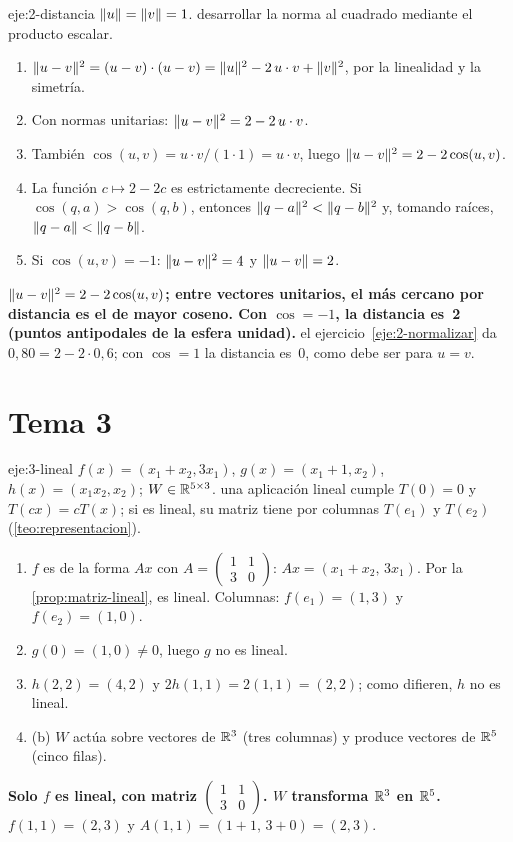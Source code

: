 \begin{solucion}{eje:2-distancia}
\datos $\lVert u\rVert=\lVert v\rVert=1$.
\planteamiento desarrollar la norma al cuadrado mediante el producto escalar.
\pasos
\begin{enumerate}[label=\arabic*.]
  \item $\lVert u-v\rVert^{2}=(u-v)\cdot(u-v)=\lVert u\rVert^{2}-2\,u\cdot v+\lVert v\rVert^{2}$, por la linealidad y la simetría.
  \item Con normas unitarias: $\lVert u-v\rVert^{2}=2-2\,u\cdot v$.
  \item También $\cos(u,v)=u\cdot v/(1\cdot 1)=u\cdot v$, luego $\lVert u-v\rVert^{2}=2-2\cos(u,v)$.
  \item La función $c\mapsto 2-2c$ es estrictamente decreciente. Si $\cos(q,a)>\cos(q,b)$, entonces $\lVert q-a\rVert^{2}<\lVert q-b\rVert^{2}$ y, tomando raíces, $\lVert q-a\rVert<\lVert q-b\rVert$.
  \item Si $\cos(u,v)=-1$: $\lVert u-v\rVert^{2}=4$ y $\lVert u-v\rVert=2$.
\end{enumerate}
\resultado \textbf{$\lVert u-v\rVert^{2}=2-2\cos(u,v)$; entre vectores unitarios, el más cercano por distancia es el de mayor coseno. Con $\cos=-1$, la distancia es~2 (puntos antipodales de la esfera unidad).}
\comprobacion el ejercicio~\ref{eje:2-normalizar} da $0{,}80=2-2\cdot 0{,}6$; con $\cos=1$ la distancia es~0, como debe ser para $u=v$.
\end{solucion}

\section{Tema 3}

\begin{solucion}{eje:3-lineal}
\datos $f(x)=(x_1+x_2,3x_1)$, $g(x)=(x_1+1,x_2)$, $h(x)=(x_1x_2,x_2)$; $W\in\mathbb{R}^{5\times 3}$.
\planteamiento una aplicación lineal cumple $T(0)=0$ y $T(cx)=cT(x)$; si es lineal, su matriz tiene por columnas $T(e_1)$ y $T(e_2)$ (\cref{teo:representacion}).
\pasos
\begin{enumerate}[label=\arabic*.]
  \item $f$ es de la forma $Ax$ con $A=\begin{pmatrix}1&1\\3&0\end{pmatrix}$: $Ax=(x_1+x_2,\,3x_1)$. Por la \cref{prop:matriz-lineal}, es lineal. Columnas: $f(e_1)=(1,3)$ y $f(e_2)=(1,0)$.
  \item $g(0)=(1,0)\neq 0$, luego $g$ no es lineal.
  \item $h(2,2)=(4,2)$ y $2h(1,1)=2(1,1)=(2,2)$; como difieren, $h$ no es lineal.
  \item (b) $W$ actúa sobre vectores de $\mathbb{R}^{3}$ (tres columnas) y produce vectores de $\mathbb{R}^{5}$ (cinco filas).
\end{enumerate}
\resultado \textbf{Solo $f$ es lineal, con matriz $\begin{pmatrix}1&1\\3&0\end{pmatrix}$. $W$ transforma $\mathbb{R}^{3}$ en $\mathbb{R}^{5}$.}
\comprobacion $f(1,1)=(2,3)$ y $A(1,1)=(1+1,\,3+0)=(2,3)$.
\end{solucion}

